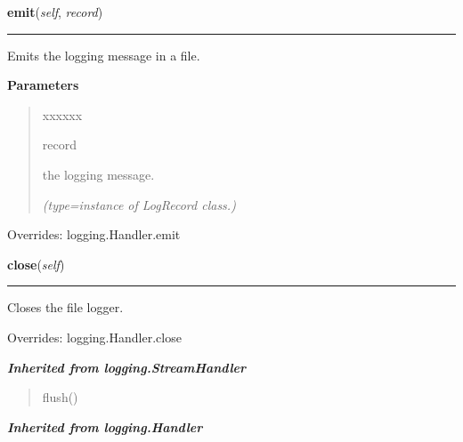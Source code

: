 \hspace{.8\funcindent}\begin{boxedminipage}{\funcwidth}

    \raggedright \textbf{emit}(\textit{self}, \textit{record})

    \vspace{-1.5ex}

    \rule{\textwidth}{0.5\fboxrule}
\setlength{\parskip}{2ex}
    Emits the logging message in a file.

\setlength{\parskip}{1ex}
      \textbf{Parameters}
      \vspace{-1ex}

      \begin{quote}
        \begin{Ventry}{xxxxxx}

          \item[record]

          the logging message.

            {\it (type=instance of LogRecord class.)}

        \end{Ventry}

      \end{quote}

      Overrides: logging.Handler.emit

    \end{boxedminipage}

    \vspace{0.5ex}

\hspace{.8\funcindent}\begin{boxedminipage}{\funcwidth}

    \raggedright \textbf{close}(\textit{self})

    \vspace{-1.5ex}

    \rule{\textwidth}{0.5\fboxrule}
\setlength{\parskip}{2ex}
    Closes the file logger.

\setlength{\parskip}{1ex}
      Overrides: logging.Handler.close

    \end{boxedminipage}


\large{\textbf{\textit{Inherited from logging.StreamHandler}}}

\begin{quote}
flush()
\end{quote}

\large{\textbf{\textit{Inherited from logging.Handler}}}

